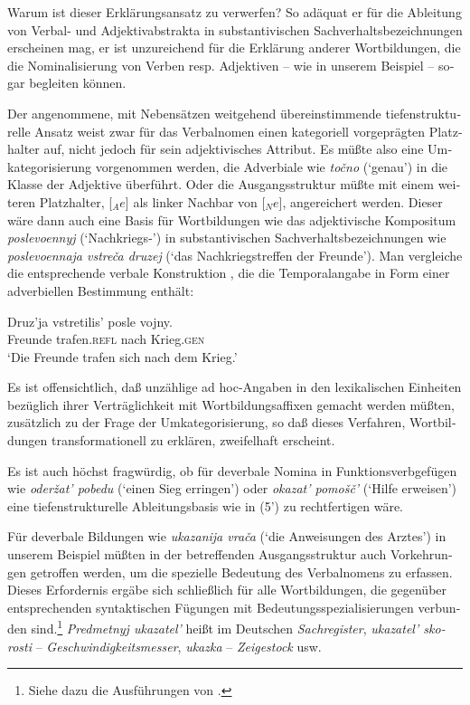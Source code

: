 \documentclass[output=paper]{langscibook}
\begin{document}
\begin{otherlanguage}{german}
\noindent Warum ist dieser Erklärungsansatz zu verwerfen? So adäquat er für die Ableitung von Verbal- und Adjektivabstrakta in substantivischen Sachverhaltsbezeichnungen erscheinen mag, er ist unzureichend für die Erklärung anderer Wortbildungen, die die Nominalisierung von Verben resp. Adjektiven -- wie in unserem Beispiel  -- sogar begleiten können.

Der angenommene, mit Nebensätzen weitgehend übereinstimmende tiefenstrukturelle Ansatz  weist zwar für das Verbalnomen einen kategoriell vorgeprägten Platzhalter auf, nicht jedoch für sein adjektivisches Attribut. Es müßte also eine Umkategorisierung vorgenommen werden, die Adverbiale wie \textit{točno} (‘genau’) in die Klasse der Adjektive überführt. Oder die Ausgangsstruktur  müßte mit einem weiteren Platzhalter, [$_{A}e$] als linker Nachbar von [$_{N}e$], an\-ge\-rei\-chert werden. Dieser wäre dann auch eine Basis für Wortbildungen wie das adjektivische Kompositum \textit{poslevoennyj} (‘Nachkriegs-’) in substantivischen Sachverhaltsbezeichnungen wie \textit{poslevoennaja vstreča druzej} (‘das Nachkriegstreffen der Freunde’). Man vergleiche die entsprechende verbale Konstruktion , die die Temporalangabe in Form einer adverbiellen Bestimmung enthält:

\ea \label{ex:zi83:11}
\gll Druz’ja vstretilis’ posle vojny. \\
Freunde trafen.\textsc{refl} nach  Krieg.\textsc{gen} \\
\glt ‘Die Freunde trafen sich nach dem Krieg.’
\z

\noindent Es ist offensichtlich, daß unzählige ad hoc-Angaben in den lexikalischen Einheiten bezüglich ihrer Verträglichkeit mit Wortbildungsaffixen gemacht werden müßten, zusätzlich zu der Frage der Umkategorisierung, so daß dieses Verfahren, Wortbildungen transformationell zu erklären, zweifelhaft erscheint.

Es ist auch höchst fragwürdig, ob für deverbale Nomina in Funktionsverbgefügen wie \textit{oderžat’ pobedu} (‘einen Sieg erringen’) oder \textit{okazat’ pomošč’} (‘Hilfe erweisen’) eine tiefenstrukturelle Ableitungsbasis wie in %
(5’) zu rechtfertigen wäre.

Für deverbale Bildungen wie \textit{ukazanija vrača} (‘die Anweisungen des Arztes’) in unserem Beispiel  müßten in der betreffenden Ausgangsstruktur auch Vorkehrungen getroffen werden, um die spezielle Bedeutung des Verbalnomens zu erfassen. Dieses Erfordernis ergäbe sich schließlich für alle Wortbildungen, die gegenüber entsprechenden syntaktischen Fügungen mit Be\-deu\-tungs\-spe\-zia\-li\-sie\-run\-gen verbunden sind.\footnote{Siehe dazu die Ausführungen von \citet{motsch1983uberlegungen-zu-den-grundlagen-der-erweiterung-des-lexikons}.} \textit{Predmetnyj ukazatel’} heißt im Deutschen \textit{Sachregister}, \textit{ukazatel’ skorosti} – \textit{Geschwindigkeitsmesser}, \textit{ukazka} – \textit{Zeigestock} usw.


\end{otherlanguage}
\end{document}
